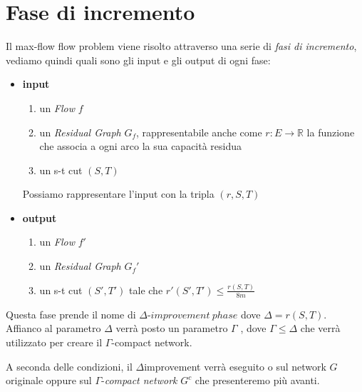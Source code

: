 \documentclass[a4paper, 11pt]{report}
\newcommand{\dlt}{$\Delta$}
\newcommand{\gmm}{$\Gamma$}
\begin{document}
\section{Fase di incremento}
Il max-flow flow problem viene risolto attraverso una serie di \textit{fasi di incremento}, vediamo quindi quali sono gli input e gli output di ogni fase:
\begin{itemize}[itemsep=0.5ex]
    \item \textbf{input}
    \begin{enumerate}
        \item un \textit{Flow} $f$
        \item un \textit{Residual Graph} $G_f$, rappresentabile anche come $r: E \rightarrow \mathbb{R}$ la funzione che associa a ogni arco la sua capacità residua
        \item un s-t cut $(S,T)$
    \end{enumerate}
    Possiamo rappresentare l'input con la tripla $(r,S,T)$
    \item \textbf{output}
    \begin{enumerate}
        \item un \textit{Flow} $f'$
        \item un \textit{Residual Graph} $G_f'$
        \item un s-t cut $(S',T')$ tale che $r'(S',T') \le \frac{r(S,T)}{8m}$
    \end{enumerate}
\end{itemize}
Questa fase prende il nome di $\Delta\text{-}improvement\ phase$ dove $\Delta = r(S,T)$.
Affianco al parametro $\Delta$ verrà posto un parametro $\Gamma$ , dove $\Gamma \le \Delta$ che verrà utilizzato per creare il $\Gamma$-compact network. 

A seconda delle condizioni, il \dlt improvement verrà eseguito o sul network $G$ originale oppure sul \gmm-\textit{compact network} $G^c$ che presenteremo più avanti.
\end{document}
